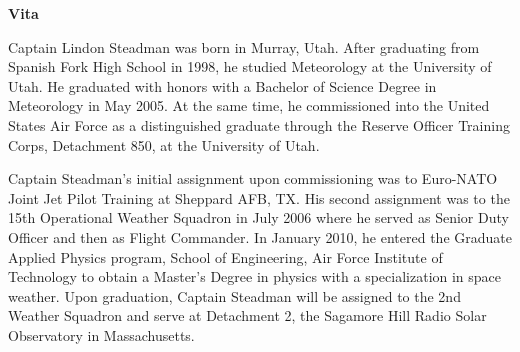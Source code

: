 

    \begin{center}
	\bfseries Vita
    \end{center}
    \vspace{2em}

\doublespace
Captain Lindon Steadman was born in Murray, Utah.  After graduating from Spanish Fork High School in 1998, he studied Meteorology at the University of Utah.  He graduated with honors with a Bachelor of Science Degree in Meteorology in May 2005.  At the same time, he commissioned into the United States Air Force as a distinguished graduate through the Reserve Officer Training Corps, Detachment 850, at the University of Utah.

Captain Steadman's initial assignment upon commissioning was to Euro-NATO Joint Jet Pilot Training at Sheppard AFB, TX.  His second assignment was to the 15th Operational Weather Squadron in July 2006 where he served as Senior Duty Officer and then as Flight Commander.  In January 2010, he entered the Graduate Applied Physics program, School of Engineering, Air Force Institute of Technology to obtain a Master's Degree in physics with a specialization in space weather.  Upon graduation, Captain Steadman will be assigned to the 2nd Weather Squadron and serve at Detachment 2, the Sagamore Hill Radio Solar Observatory in Massachusetts.
\singlespace

